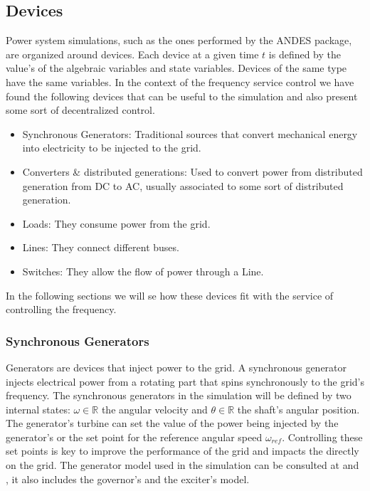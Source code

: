 \documentclass{article}
\begin{document}
\subsection{Devices}\label{sec:devices}

Power system simulations, such as the ones performed by the ANDES package, are organized around devices. Each device at a given time $t$ is defined by the value's of the algebraic variables and state variables. Devices of the same type have the same variables. In the context of the frequency service control we have found the following devices that can be useful to the simulation and also present some sort of decentralized control.

\begin{itemize}
    \item Synchronous Generators: Traditional sources that convert mechanical energy into electricity to be injected to the grid.
    \item Converters \& distributed generations: Used to convert power from distributed generation from DC to AC, usually associated to some sort of distributed generation.
    \item Loads: They consume power from the grid.
    \item Lines: They connect different buses.
    \item Switches: They allow the flow of power through a Line.
\end{itemize}

In the following sections we will se how these devices fit with the service of controlling the frequency.

\subsubsection*{Synchronous Generators}

Generators are devices that inject power to the grid. A synchronous generator injects electrical power from a rotating part that spins synchronously to the grid's frequency. The synchronous generators in the simulation will be defined by two internal states: $\omega \in \mathbb{R}$ the angular velocity and $\theta  \in \mathbb{R}$ the shaft's angular position. The generator's turbine can set the value of the power being injected by the generator's or the set point for the reference angular speed $\omega_{ref}$. Controlling these set points is key to improve the performance of the grid and impacts the directly on the grid. The generator model used in the simulation can be consulted at \cite{image:diagram:governor} and \cite{source:andes:models:generator}, it also includes the governor's and the exciter's model.
\end{document}
